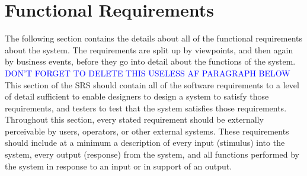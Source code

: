 \documentclass[]{article}
\begin{document}

\section{Functional Requirements}
\label{sec:functional_requirements}
The following section contains the details about all of the functional requirements about the system. The requirements are split up by viewpoints, and then again by business events, before they go into detail about the functions of the system.\\ 

\textcolor{blue}{DON'T FORGET TO DELETE THIS USELESS AF PARAGRAPH BELOW}\\

This section of the SRS should contain all of the software requirements to a level of detail sufficient to enable designers to design a system to satisfy those requirements, and testers to test that the system satisfies those requirements. Throughout this section, every stated requirement should be externally perceivable by users, operators, or other external systems. These requirements should include at a minimum a description of every input (stimulus) into the system, every output (response) from the system, and all functions performed by the system in response to an input or in support of an output.
\end{document}
